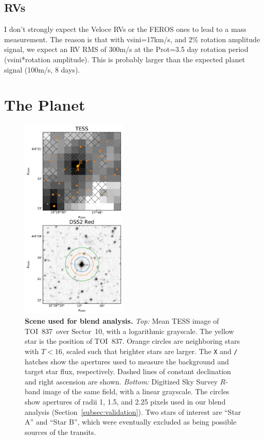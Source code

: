 \documentclass[12pt,twocolumn,tighten]{aastex62}
\newcommand{\tn}{TOI~837} %
\begin{document}
\subsection{RVs}
I don't strongly expect the Veloce RVs or the FEROS ones to lead to a
mass measurement. The reason is that with vsini=17km/s, and 2\%
rotation amplitude signal, we expect an RV RMS of 300m/s at the
Prot=3.5 day rotation period (vsini*rotation amplitude). This is
probably larger than the expected planet signal (100m/s, 8 days).



\section{The Planet}
\label{sec:planet}

\begin{figure}[t]
	\begin{center}
		\leavevmode
		\includegraphics[width=0.45\textwidth]{f3.pdf}
	\end{center}
	\vspace{-0.7cm}
	\caption{ {\bf Scene used for blend analysis.}
    {\it Top:} Mean TESS image of \tn\ over Sector~10, with a
    logarithmic grayscale. The yellow star is the position of \tn.
    Orange circles are neighboring stars with $T<16$, scaled such that
    brighter stars are larger. The \texttt{X} and \texttt{/} hatches
    show the apertures used to measure the background and target star
    flux, respectively. Dashed lines of constant declination and right
    ascension are shown.  {\it Bottom:} Digitized Sky Survey $R$-band
    image of the same field, with a linear grayscale. The circles show
    apertures of radii 1, 1.5, and 2.25 pixels used in our blend
    analysis (Section~\ref{subsec:validation}).  Two stars of interest
    are ``Star A'' and ``Star B'', which were eventually excluded as
    being possible sources of the transits.
		\label{fig:scene}
	}
\end{figure}
\end{document}
